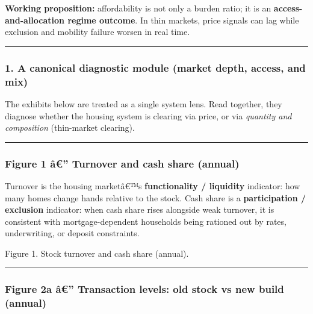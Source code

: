 \textbf{Working proposition:} affordability is not only a burden ratio;
it is an \textbf{access-and-allocation regime outcome}. In thin markets,
price signals can lag while exclusion and mobility failure worsen in
real time.

\begin{center}\rule{0.5\linewidth}{0.5pt}\end{center}

\protect{}\label{part1-exhibits}
\subsubsection{1. A canonical diagnostic module (market depth, access,
and
mix)}\label{a-canonical-diagnostic-module-market-depth-access-and-mix}

The exhibits below are treated as a single system lens. Read together,
they diagnose whether the housing system is clearing via price, or via
\emph{quantity and composition} (thin-market clearing).

\begin{center}\rule{0.5\linewidth}{0.5pt}\end{center}

\protect{}\label{part1-fig1}
\subsubsection{Figure 1 â€'' Turnover and cash share
(annual)}\label{figure-1-uxe2-turnover-and-cash-share-annual}

Turnover is the housing marketâ€™s \textbf{functionality / liquidity}
indicator: how many homes change hands relative to the stock. Cash share
is a \textbf{participation / exclusion} indicator: when cash share rises
alongside weak turnover, it is consistent with mortgage-dependent
households being rationed out by rates, underwriting, or deposit
constraints.

Figure 1. Stock turnover and cash share (annual).

\begin{center}\rule{0.5\linewidth}{0.5pt}\end{center}

\protect{}\label{part1-fig2a}
\subsubsection{Figure 2a â€'' Transaction levels: old stock vs new build
(annual)}\label{figure-2a-uxe2-transaction-levels-old-stock-vs-new-build-annual}

